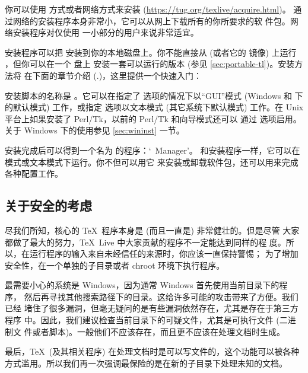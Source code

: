 \documentclass{article}
\begin{document}
你可以使用 \DVD{} 方式或者网络方式来安装 \TL{}
(\url{https://tug.org/texlive/acquire.html})。
通过网络的安装程序本身非常小，它可以从网上下载所有的你所要求的软
件包。网络安装程序对仅使用 \TL{} 一小部分的用户来说非常适宜。

\DVD{} 安装程序可以把 \TL{} 安装到你的本地磁盘上。你不能直接从 \TK{}
\DVD{} (或者它的  镜像) 上运行 \TL{}，但你可以在一个 \USB{} 盘上
安装一套可以运行的版本 (参见 \ref{sec:portable-tl})。安装方法将
在下面的章节介绍 (\p.\pageref{sec:install})，这里提供一个快速入门：

\begin{itemize*}

\item 安装脚本的名称是 。它可以在指定了
 选项的情况下以“GUI”模式 (Windows 和 \MacOSX{} 下的默认模式)
工作，或指定  选项以文本模式 (其它系统下默认模式)
工作。在 Unix 平台上如果安装了 Perl/Tk，以前的 Perl/Tk 和向导模式还可以
通过  选项启用。关于 Windows 下的使用参见
\ref{sec:wininst} 一节。

\item 安装完成后可以得到一个名为  的程序：`\TL\ Manager'。
和安装程序一样，它可以在 \GUI{} 模式或文本模式下运行。你不但可以用它
来安装或卸载软件包，还可以用来完成各种配置工作。

\end{itemize*}

\subsection{关于安全的考虑}
\label{sec:security}

尽我们所知，核心的 \TeX\ 程序本身是 (而且一直是) 非常健壮的。但是尽管
大家都做了最大的努力，\TeX\ Live 中大家贡献的程序不一定能达到同样的程
度。所以，在运行程序的输入来自未经信任的来源时，你应该一直保持警惕；
为了增加安全性，在一个单独的子目录或者 chroot 环境下执行程序。

最需要小心的系统是 Windows，因为通常 Windows 首先使用当前目录下的程序，
然后再寻找其他搜索路径下的目录。这给许多可能的攻击带来了方便。我们已经
堵住了很多漏洞，但毫无疑问的是有些漏洞依然存在，尤其是存在于第三方程序
中。因此，我们建议检查当前目录下的可疑文件，尤其是可执行文件 (二进制文
件或者脚本)。一般他们不应该存在，而且更不应该在处理文档时生成。

最后，\TeX\ (及其相关程序) 在处理文档时是可以写文件的，这个功能可以被各种
方式滥用。所以我们再一次强调最保险的是在新的子目录下处理未知的文档。
\end{document}
